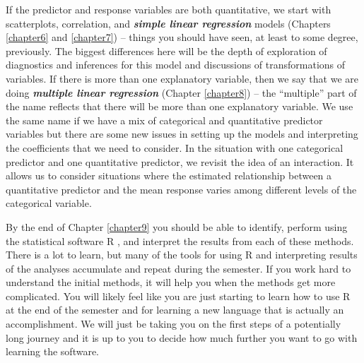\documentclass[]{book}
\renewcommand{\indent}{\hspace{15pt}}
\begin{document}
\indent If the predictor and response variables are both quantitative, we start with
scatterplots, correlation,
and \textbf{\emph{simple linear regression}} models (Chapters \ref{chapter6} and
\ref{chapter7}) -- things you should have seen, at least to some degree,
previously. The biggest differences here will be
the depth of exploration of diagnostics and inferences for this model and
discussions of transformations of variables.  If there is more than one
explanatory variable, then we say that we are doing \textbf{\emph{multiple linear regression}}
(Chapter \ref{chapter8}) -- the ``multiple'' part of the name reflects that there will
be more
than one explanatory variable. We use the same name if we have a mix of
categorical and quantitative predictor variables but there are some new issues
in setting up the models and interpreting the coefficients that we need to
consider. In the situation with one categorical predictor and one quantitative
predictor, we revisit the idea of an interaction.
It allows us to consider situations
where the estimated relationship between a quantitative predictor and the
mean response
varies among different levels of the categorical variable.

\indent By the end of Chapter \ref{chapter9} you should be able to identify, perform
using the statistical software R \citep{R-base}, and interpret the results from each of these methods. There
is a lot to learn, but many of the tools for using R and interpreting results
of the analyses accumulate and repeat during the semester. If you work hard to
understand the initial methods, it will help you when the methods get more
complicated. You will likely feel like you are just starting to learn how to
use R at the end of the semester and for learning a new language that is
actually an accomplishment. We will just be taking you on the first steps of a
potentially long journey and it is up to you to decide how much further you
want to go with learning the software.
\end{document}
